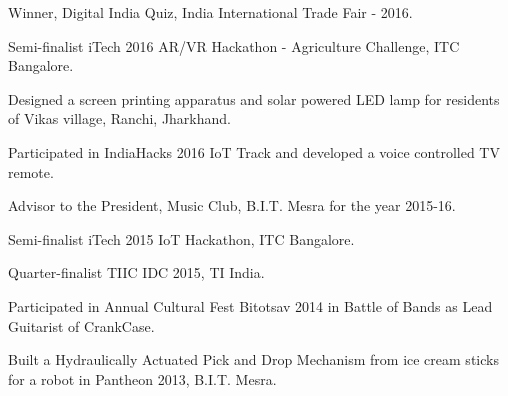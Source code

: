 \begin{cventries}
  \cventry
  {}
  {}
  {}
  {}
  {\vspace{-4mm}
   \begin{cvitems}
	 \item {Winner, Digital India Quiz, India International Trade Fair - 2016.}     
     \item {Semi-finalist iTech 2016 AR/VR Hackathon - Agriculture Challenge, ITC Bangalore.}
	 \item {Designed a screen printing apparatus and solar powered LED lamp for residents of Vikas village, Ranchi, Jharkhand.}   	 
   	 \item {Participated in IndiaHacks 2016 IoT Track and developed a voice controlled TV remote.}
     \item {Advisor to the President, Music Club, B.I.T. Mesra for the year 2015-16.}
     \item {Semi-finalist iTech 2015 IoT Hackathon, ITC Bangalore.}
     \item {Quarter-finalist TIIC IDC 2015, TI India.}     
     \item {Participated in Annual Cultural Fest Bitotsav 2014 in Battle of Bands as Lead Guitarist of CrankCase.}
	 \item {Built a Hydraulically Actuated Pick and Drop Mechanism from ice cream sticks for a robot in Pantheon 2013, B.I.T. Mesra.}
   \end{cvitems}
   }
\end{cventries}